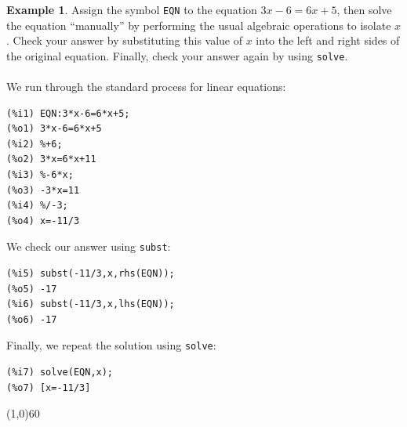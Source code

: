 \documentclass[10.5pt,twoside]{report}
\theoremstyle{definition}
\newtheorem{exmp}{Example}[section]
\begin{document}
\begin{exmp} Assign the symbol \verb|EQN| to the equation $3x-6=6x+5$, then solve the equation ``manually'' by performing the usual algebraic operations to isolate $x$.  Check your answer by substituting this value of $x$ into the left and right sides of the original equation.  Finally, check your answer again by using \verb|solve|.\\
${}$\\

We run through the standard process for linear equations:

\begin{verbatim}
(%i1) EQN:3*x-6=6*x+5;
(%o1) 3*x-6=6*x+5
(%i2) %+6;
(%o2) 3*x=6*x+11
(%i3) %-6*x;
(%o3) -3*x=11
(%i4) %/-3;
(%o4) x=-11/3
\end{verbatim}

We check our answer using \verb|subst|:

\begin{verbatim}
(%i5) subst(-11/3,x,rhs(EQN));
(%o5) -17
(%i6) subst(-11/3,x,lhs(EQN));
(%o6) -17
\end{verbatim}

Finally, we repeat the solution using \verb|solve|:

\begin{verbatim}
(%i7) solve(EQN,x);
(%o7) [x=-11/3]
\end{verbatim}


\end{exmp}


\line(1,0){60}
\linethickness{0.5mm}
\end{document}
